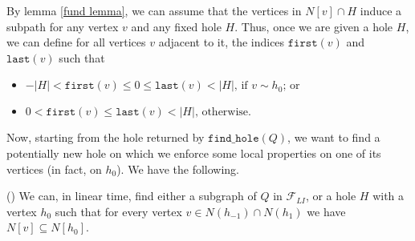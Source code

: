 \documentclass{article}
\begin{document}
    By lemma \ref{fund lemma},
    we can assume that
    the vertices in $N\left[v\right] \cap H$
    induce a subpath for any vertex
    $v$ and any fixed hole $H$.
    Thus, once we are given
    a hole $H$, we can
    define for all vertices
    $v$ adjacent to it,
    the indices $\texttt{first}\left(v\right)$
    and $\texttt{last}\left(v\right)$
    such that 
    \begin{itemize}
        \item $-\left|H\right| < \texttt{first}\left(v\right)
            \leq 0 \leq \texttt{last}\left(v\right) < \left|H\right|
            \text{, if } v \sim h_{0}\text{; or}$ 
        \item $0 < \texttt{first}\left(v\right) 
            \leq \texttt{last}\left(v\right) < \left|H\right|
            \text{, otherwise.}$
    \end{itemize}
    
    Now, starting from 
    the hole returned
    by $\texttt{find\_hole}\left(Q\right)$, we
    want to find a potentially new hole
    on which we
    enforce some local
    properties on one of its 
    vertices (in fact, on $h_0$).
    We have the following.

    \begin{lemma} (\cite{main}) \label{hole lemma}
        We can, in linear time,
        find either a subgraph
        of $Q$ in $\mathcal{F}_{LI}$, 
        or a hole $H$ with
        a vertex $h_0$ such that
        for every vertex $v \in N\left(h_{-1}\right) \cap  N\left(h_{1}\right)$
        we have
        $N\left[v\right] \subseteq N\left[h_0\right]$.
    \end{lemma}
    
\end{document}
